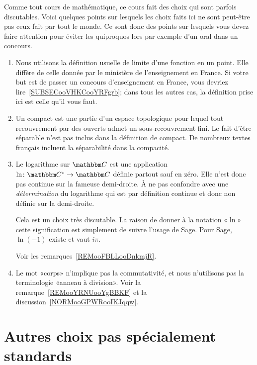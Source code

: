 Comme tout cours de mathématique, ce cours fait des choix qui sont parfois discutables. Voici quelques points sur lesquels les choix faits ici ne sont peut-être pas ceux fait par tout le monde. Ce sont donc des points sur lesquels vous devez faire attention pour éviter les quiproquos lors par exemple d'un oral dans un concours.

\begin{enumerate}
    \item
        Nous utilisons la définition usuelle de limite d'une fonction en un point. Elle diffère de celle donnée par le ministère de l'enseignement en France. Si votre but est de passer un concours d'enseignement en France, vous devriez lire~\ref{SUBSECooVHKCooYRFgrb}; dans tous les autres cas, la définition prise ici est celle qu'il vous faut.
    \item
        Un compact est une partie d'un espace topologique pour lequel tout recouvrement par des ouverts admet un sous-recouvrement fini. Le fait d'être séparable n'est pas inclus dans la définition de compact. De nombreux textes français incluent la séparabilité dans la compacité.
    \item
        Le logarithme sur \( \eC\) est une application \( \ln\colon \eC^*\to \eC\) définie partout sauf en zéro. Elle n'est donc pas continue sur la fameuse demi-droite. À ne pas confondre avec une \emph{détermination} du logarithme qui est par définition continue et donc non définie sur la demi-droite.

        Cela est un choix très discutable. La raison de donner à la notation «\( \ln\)» cette signification est simplement de suivre l'usage de Sage. Pour Sage, \( \ln(-1)\) existe et vaut \( i\pi\).

        Voir les remarques~\ref{REMooFBLLooDnkmjR}.
    \item
        Le mot «corps» n'implique pas la commutativité, et nous n'utilisons pas la terminologie «anneau à division». Voir la remarque~\ref{REMooYRNUooYgBBKF} et la discussion~\ref{NORMooGPWRooIKJqqw}.
\end{enumerate}

\section{Autres choix pas spécialement standards}

